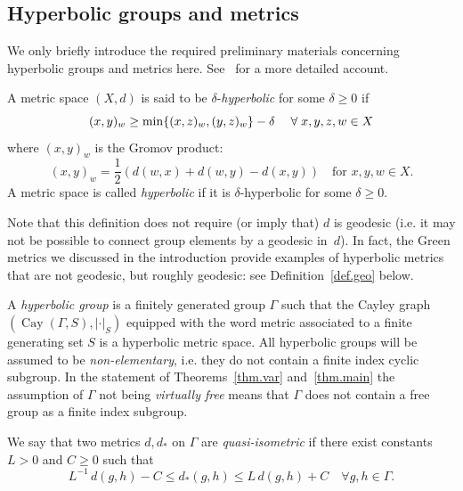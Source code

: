 \documentclass[AHL,Unicode,longabstracts,published]{cedram}
\newcommand{\G}{\Gamma}
\renewcommand{\d}{\delta}
\DeclareMathOperator{\Cay}{Cay}
\let\originalleft\left
\let\originalright\right
\renewcommand{\left}{\mathopen{}\mathclose\bgroup\originalleft}
\renewcommand{\right}{\aftergroup\egroup\originalright}
\theoremstyle{plain}
\let\oldforall\forall
\renewcommand*{\forall}{\mathrel{\oldforall}}
\newcommand{\G}{\Gamma}
\begin{document}
\subsection{Hyperbolic groups and metrics}

We only briefly introduce the required preliminary materials concerning hyperbolic groups and metrics here. See~\cite[Section~2]{cantrell.tanaka.1} for a more detailed account.

\begin{defi}
A metric space $(X, d)$ is said to be $\d$-\emph{hyperbolic} for some $\delta \ge 0$ if
\begin{equation*}
(x,y)_w \ge \min\left\{(x,z)_w, (y,z)_w\right\}-\d \quad %
\forall
x, y, z, w \in X
\end{equation*}
where $(x,y)_w$ is the Gromov product:
\[
(x,y)_w =\frac{1}{2}(d(w, x)+d(w, y)-d(x, y)) \quad \text{for } x, y, w \in X.
\]
A metric space is called \emph{hyperbolic} if it is $\d$-hyperbolic for some $\d \ge 0$.
\end{defi}
\begin{rema}
Note that this definition does not require (or imply that) $d$ is geodesic (i.e. it may not be possible to connect group elements by a geodesic in~$d$). In fact, the Green metrics we discussed in the introduction provide examples of hyperbolic metrics that are not geodesic, but roughly geodesic: see Definition~\ref{def.geo} below.
\end{rema}

A \emph{hyperbolic group} is a finitely generated group $\G$ such that the Cayley graph $(\Cay(\G,S), |\cdot|_S)$ equipped with the word metric associated to a finite generating set $S$ is a hyperbolic metric space. All hyperbolic groups will be assumed to be \emph{non-elementary}, i.e. they do not contain a finite index cyclic subgroup. In the statement of Theorems~\ref{thm.var} and~\ref{thm.main} the assumption of $\G$ not being \emph{virtually free} means that $\G$ does not contain a free group as a finite index subgroup.

\begin{defi}
We say that two metrics $d,d_\ast$ on $\G$ are \emph{quasi-isometric} if there exist constants $L > 0$ and $C \ge 0$ such that
\[
L^{-1} \, d(g, h)-C \le d_\ast(g, h) \le L \, d(g, h)+C \quad \forall g, h \in \G.
\]
\end{defi}
\end{document}
